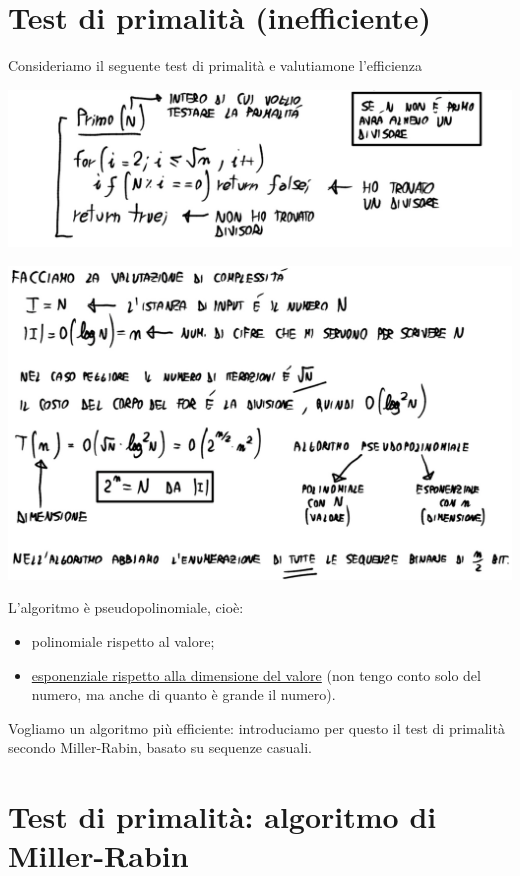 \section{Test di primalità (inefficiente)}
Consideriamo il seguente test di primalità e valutiamone l'efficienza
\begin{center}
	\includegraphics[scale=.61]{images/6.PNG}
\end{center}
\begin{center}
	\includegraphics[scale=.7]{images/6bis.PNG}
\end{center}
L'algoritmo è pseudopolinomiale, cioè:
\begin{itemize}
	\item polinomiale rispetto al valore;
	\item \underline{esponenziale rispetto alla dimensione del valore} (non tengo conto solo del numero, ma anche di quanto è grande il numero).
\end{itemize}
Vogliamo un algoritmo più efficiente: introduciamo per questo il test di primalità secondo Miller-Rabin, basato su sequenze casuali.

\section{Test di primalità: algoritmo di Miller-Rabin}
